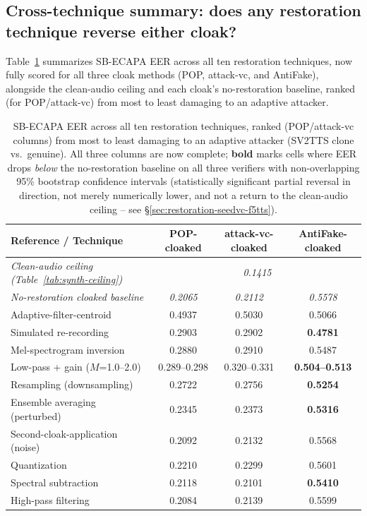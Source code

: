 \documentclass[11pt]{article}
\begin{document}
\subsection{Cross-technique summary: does any restoration technique reverse either cloak?}
\label{sec:restoration-summary}

Table~\ref{tab:restoration-crosstechnique} summarizes SB-ECAPA EER
across all ten restoration techniques, now fully scored for all three
cloak methods (POP, attack-vc, and AntiFake), alongside the clean-audio
ceiling and each cloak's no-restoration baseline, ranked (for
POP/attack-vc) from most to least damaging to an adaptive attacker.

\begin{table}[H]
\centering
\caption{SB-ECAPA EER across all ten restoration techniques, ranked
(POP/attack-vc columns) from most to least damaging to an adaptive
attacker (SV2TTS clone vs.\ genuine). All three columns are now
complete; \textbf{bold} marks cells where EER drops \emph{below} the
no-restoration baseline on all three verifiers with non-overlapping
95\% bootstrap confidence intervals (statistically significant partial
reversal in direction, not merely numerically lower, and not a return
to the clean-audio ceiling -- see \S\ref{sec:restoration-seedvc-f5tts}).}
\label{tab:restoration-crosstechnique}
\begin{tabular}{lccc}
\toprule
Reference / Technique & POP-cloaked & attack-vc-cloaked & AntiFake-cloaked \\
\midrule
\emph{Clean-audio ceiling (Table~\ref{tab:synth-ceiling})} & \multicolumn{3}{c}{\emph{0.1415}} \\
\emph{No-restoration cloaked baseline} & \emph{0.2065} & \emph{0.2112} & \emph{0.5578} \\
\midrule
Adaptive-filter-centroid       & 0.4937 & 0.5030 & 0.5066 \\
Simulated re-recording         & 0.2903 & 0.2902 & \textbf{0.4781} \\
Mel-spectrogram inversion      & 0.2880 & 0.2910 & 0.5487 \\
Low-pass + gain ($M$=1.0--2.0)  & 0.289--0.298 & 0.320--0.331 & \textbf{0.504--0.513} \\
Resampling (downsampling)      & 0.2722 & 0.2756 & \textbf{0.5254} \\
Ensemble averaging (perturbed) & 0.2345 & 0.2373 & \textbf{0.5316} \\
Second-cloak-application (noise) & 0.2092 & 0.2132 & 0.5568 \\
Quantization                   & 0.2210 & 0.2299 & 0.5601 \\
Spectral subtraction           & 0.2118 & 0.2101 & \textbf{0.5410} \\
High-pass filtering            & 0.2084 & 0.2139 & 0.5599 \\
\bottomrule
\end{tabular}
\end{table}
\end{document}
